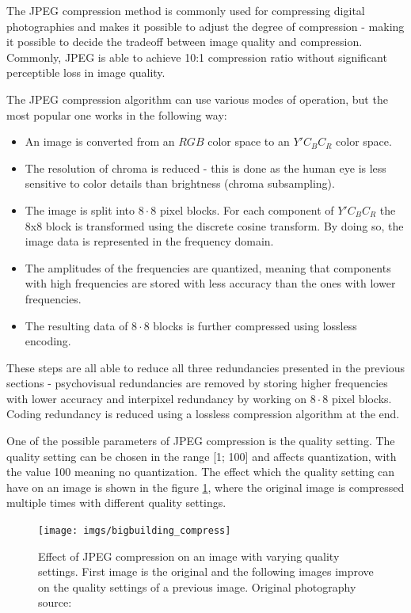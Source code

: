 \documentclass[thesis=M,english]{FITthesis}[2012/10/20]
\begin{document}
The JPEG compression method is commonly used for compressing digital
photographies and makes it possible to adjust the degree of compression
- making it possible to decide the tradeoff between image quality and
compression. Commonly, JPEG is able to achieve 10:1 compression ratio
without significant perceptible loss in image quality.\cite{nasajpeg}

The JPEG compression algorithm can use various modes of operation, but
the most popular one works in the following way:
\begin{itemize}
    \item An image is converted from an $RGB$ color space to an $Y'C_BC_R$ color space.
    \item The resolution of chroma is reduced - this is done as the human eye is less
    sensitive to color details than brightness (chroma subsampling).
    \item The image is split into $8 \cdot 8$ pixel blocks. For each component of $Y'C_BC_R$
    the 8x8 block is transformed using the discrete cosine transform. By doing so,
    the image data is represented in the frequency domain.
    \item The amplitudes of the frequencies are quantized, meaning that components
    with high frequencies are stored with less accuracy than the ones with lower
    frequencies.
    \item The resulting data of $8 \cdot 8$ blocks is further compressed using lossless
    encoding.
\end{itemize}
These steps are all able to reduce all three redundancies presented in the previous
sections - psychovisual redundancies are removed by storing higher frequencies with
lower accuracy and interpixel redundancy by working on $8 \cdot 8$ pixel blocks. Coding
redundancy is reduced using a lossless compression algorithm at the end.

One of the possible parameters of JPEG compression is the quality setting. The quality
setting can be chosen in the range [1; 100] and affects quantization, with the value
100 meaning no quantization. The effect which the quality setting can have on an
image is shown in the figure \ref{fig:jpegquality}, where the original image is compressed
multiple times with different quality settings.

\begin{figure}[h]
  \centering
  \texttt{[image: imgs/bigbuilding\_compress]}
  \caption[Accuracy of JPEG with different quality settings]{Effect of JPEG compression on an image with varying quality settings.
           First image is the original and the following images improve on the
           quality settings of a previous image. Original photography source: \cite{imgcomprbenchmark}}
  \label{fig:jpegquality}
\end{figure}
\end{document}
